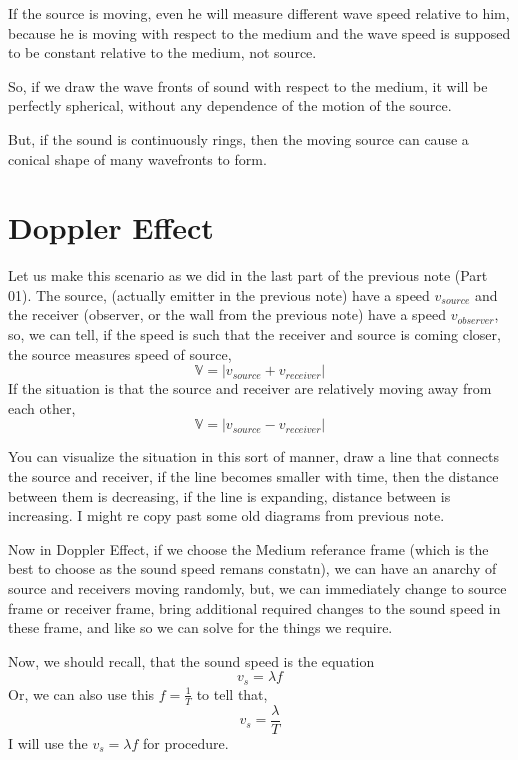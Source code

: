 \documentclass[a4paper]{article}
\begin{document}
If the source is moving, even he will measure different wave speed relative to him, because he is moving with respect to the medium and the wave 
speed is supposed to be constant relative to the medium, not source. 

So, if we draw the wave fronts of sound with respect to the medium, it will be perfectly spherical, without any dependence of the motion of the source. 

But, if the sound is continuously rings, then the moving source can cause a conical shape of many wavefronts to form. 


\section{Doppler Effect }
Let us make this scenario as we did in the last part of the previous note (Part 01). The source, (actually emitter in the previous note) have a speed $v_{source}$ 
and the receiver (observer, or the wall from the previous note) have a speed $v_{observer}$, so, we can tell, if the speed is such that the 
receiver and source is coming closer, the source measures speed of source, 
\[ \mathbb{V} =| v_{source} + v_{receiver} | \]
If the situation is that the source and receiver are relatively moving away from each other, 
\[ \mathbb{V} = | v_{source} - v_{receiver} |  \]

You can visualize the situation in this sort of manner, draw a line that connects the source and receiver, 
if the line becomes smaller with time, then the distance between them is decreasing, if the line is expanding,
distance between is increasing. I might re copy past some old diagrams from previous note. 

Now in Doppler Effect, if we choose the Medium referance frame (which is the best to choose as the sound speed remans constatn),
we can have an anarchy of source and receivers moving randomly, but, we can immediately change to source frame or receiver frame, bring additional
required changes to the sound speed in these frame, and like so we can solve for the things we require. 

Now, we should recall, that the sound speed is the equation \begin{equation}
v_s = \lambda f
\end{equation} 
Or, we can also use this $f = \frac{1}{T}$ to tell that, \begin{equation}
v_s = \frac{ \lambda }{ T }
\end{equation} 
I will use the $v_s = \lambda f$ for procedure. 
\end{document}
